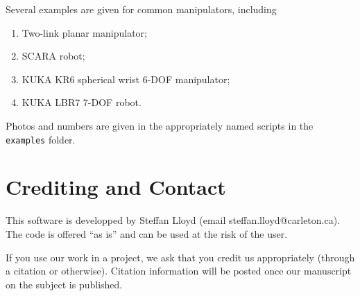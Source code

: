 \documentclass[12pt]{article}
\begin{document}
Several examples are given for common manipulators, including
\begin{enumerate}[itemsep=0pt]
	\item Two-link planar manipulator;
	\item SCARA robot;
	\item KUKA KR6 spherical wrist 6-DOF manipulator;
	\item KUKA LBR7 7-DOF robot.
\end{enumerate}\vspace{1em}
Photos and numbers are given in the appropriately named scripts in the \texttt{examples} folder.

\section{Crediting and Contact}

This software is developped by Steffan Lloyd (email steffan.lloyd@carleton.ca). The code is offered ``as is'' and can be used at the risk of the user.

If you use our work in a project, we ask that you credit us appropriately (through a citation or otherwise). Citation information will be posted once our manuscript on the subject is published.



\end{document}
